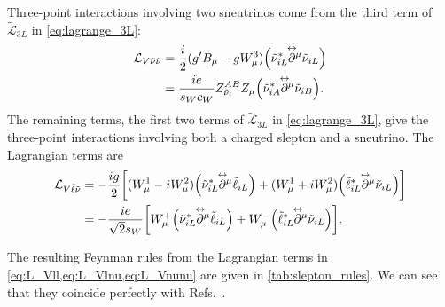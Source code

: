 Three-point interactions involving two sneutrinos come from the third term of $\tilde{\mathcal{L}}_{3L}$ in \cref{eq:lagrange_3L}:
\begin{align}
    \mathcal{L}_{V\tilde\nu\tilde\nu} &= \frac{i}{2} (g'B_\mu-gW^3_\mu) \Bigl( \tilde\nu_{iL}^* \overset{\hspace{-0.5em}\leftrightarrow}{\partial^{\mu}} \tilde\nu_{iL} \Bigr)
    \nonumber
    \\
    &= \frac{ie}{s_Wc_W} Z_{\tilde\nu_i}^{AB} Z_\mu \Bigl( \tilde\nu_{iA}^* \overset{\hspace{-0.5em}\leftrightarrow}{\partial^{\mu}} \tilde\nu_{iB} \Bigr).
    \label{eq:L_Vnunu}
\end{align}
The remaining terms, the first two terms of $\tilde{\mathcal{L}}_{3L}$ in \cref{eq:lagrange_3L}, give the three-point interactions involving both a charged slepton and a sneutrino. The Lagrangian terms are
\begin{align}
    \mathcal{L}_{V\tilde\ell\tilde\nu} &= -\frac{ig}{2} \biggl[
        (W^1_\mu-iW^2_\mu) \Bigl( \tilde\nu_{iL}^* \overset{\hspace{-0.5em}\leftrightarrow}{\partial^{\mu}} \tilde\ell_{iL} \Bigr)
        + (W^1_\mu + iW^2_\mu) \Bigl( \tilde\ell_{iL}^* \overset{\hspace{-0.5em}\leftrightarrow}{\partial^{\mu}} \tilde\nu_{iL} \Bigr)
    \biggr]
    \nonumber
    \\
    &= -\frac{ie}{\sqrt{2}s_W} \biggl[
        W^+_\mu \Bigl( \tilde\nu_{iL}^* \overset{\hspace{-0.5em}\leftrightarrow}{\partial^{\mu}} \tilde\ell_{iL} \Bigr)
        + W^-_\mu \Bigl( \tilde\ell_{iL}^* \overset{\hspace{-0.5em}\leftrightarrow}{\partial^{\mu}} \tilde\nu_{iL} \Bigr)
    \biggr].
    \label{eq:L_Vlnu}
\end{align}

The resulting Feynman rules from the Lagrangian terms in \cref{eq:L_Vll,eq:L_Vlnu,eq:L_Vnunu} are given in \cref{tab:slepton_rules}.
We can see that they coincide perfectly with Refs.~\cite{Richardson:2000nt,Rosiek:1989sce}.


